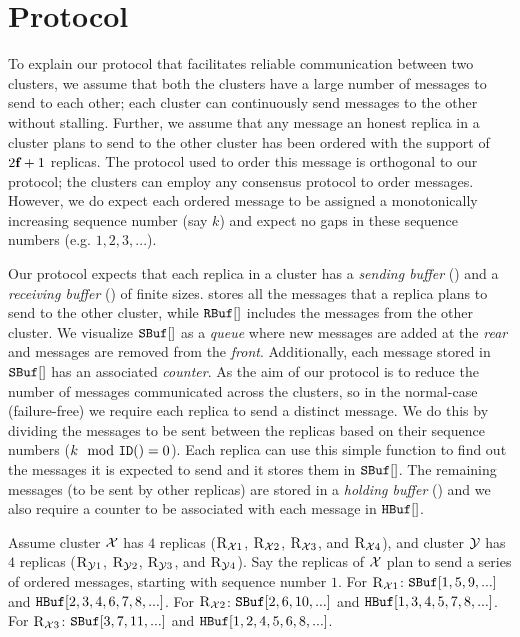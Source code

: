 \section{\Shadow{} Protocol}
To explain our protocol that facilitates reliable communication between two clusters, 
we assume that both the clusters have a large number of messages to send to each other; 
each cluster can continuously send messages to the other without stalling.
Further, we assume that any message an honest replica in a cluster plans to send to the other cluster 
has been ordered with the support of $2\textbf{f}_{}+1$ replicas.
The protocol used to order this message is orthogonal to our \Shadow{} protocol;
the clusters can employ any consensus protocol to order messages.
However, we do expect each ordered message to be assigned a monotonically increasing sequence number (say $k$)
and expect no gaps in these sequence numbers (e.g. $1,2,3,...$).

Our \Shadow{} protocol expects that each replica in a cluster has a {\em sending buffer} (\Sbuf{}) and 
a {\em receiving buffer} (\Rbuf{}) of finite sizes. 
\Sbuf{} stores all the messages that a replica plans to send to the other cluster, while $\texttt{RBuf}[{}]$ 
includes the messages from the other cluster. 
We visualize $\texttt{SBuf}[{}]$ as a {\em queue} where new messages are added at the {\em rear} and 
messages are removed from the {\em front}.
Additionally, each message stored in $\texttt{SBuf}[{}]$ has an associated {\em counter}. 
As the aim of our protocol is to reduce the number of messages communicated across the clusters, 
so in the normal-case (failure-free) we require each replica to send a distinct message.
We do this by dividing the messages to be sent between the replicas based on their sequence numbers ($k \mod \ID{} = 0$).
Each replica can use this simple function to find out the messages it is expected to send and it stores them 
in $\texttt{SBuf}[{}]$.
The remaining messages (to be sent by other replicas) are stored in a {\em holding buffer} (\Hbuf{}) and 
we also require a counter to be associated with each message in $\texttt{HBuf}[{}]$. 

\begin{example}\label{ex:rep-send}
Assume cluster $\mathcal{X}$ has $4$ replicas ($\textsc{R}_{{\mathcal{X}}{1}}$, $\textsc{R}_{{\mathcal{X}}{2}}$, $\textsc{R}_{{\mathcal{X}}{3}}$, and $\textsc{R}_{{\mathcal{X}}{4}}$), 
and 
cluster $\mathcal{Y}$ has $4$ replicas ($\textsc{R}_{{\mathcal{Y}}{1}}$, $\textsc{R}_{{\mathcal{Y}}{2}}$, $\textsc{R}_{{\mathcal{Y}}{3}}$, and $\textsc{R}_{{\mathcal{Y}}{4}}$).
Say the replicas of $\mathcal{X}$ plan to send a series of ordered messages, starting with sequence number $1$. 
For $\textsc{R}_{{\mathcal{X}}{1}}$: $\texttt{SBuf}[{1,5,9,...}]$ and $\texttt{HBuf}[{2,3,4,6,7,8,...}]$. 
For $\textsc{R}_{{\mathcal{X}}{2}}$: $\texttt{SBuf}[{2,6,10,...}]$ and $\texttt{HBuf}[{1,3,4,5,7,8,...}]$.
For $\textsc{R}_{{\mathcal{X}}{3}}$: $\texttt{SBuf}[{3,7,11,...}]$ and $\texttt{HBuf}[{1,2,4,5,6,8,...}]$.
\end{example}


